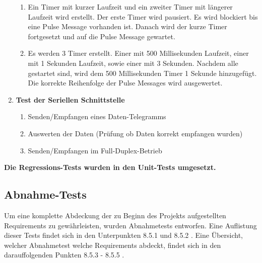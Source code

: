 \documentclass[oneside,a4paper,titlepage]{scrartcl}              %
\begin{document}
\begin{enumerate}
\begin{enumerate}
    \item Ein Timer mit kurzer Laufzeit und ein zweiter Timer mit längerer Laufzeit wird erstellt. Der erste Timer wird pausiert. Es wird blockiert bis eine Pulse Message vorhanden ist. Danach wird der kurze Timer fortgesetzt und auf die Pulse Message gewartet.
    \item Es werden 3 Timer erstellt. Einer mit 500 Millisekunden Laufzeit, einer mit 1 Sekunden Laufzeit, sowie einer mit 3 Sekunden. Nachdem alle gestartet sind, wird dem 500 Millisekunden Timer 1 Sekunde hinzugefügt. Die korrekte Reihenfolge der Pulse Messages wird ausgewertet.
  \end{enumerate}
  \item \textbf{Test der Seriellen Schnittstelle}
  \begin{enumerate}
    \item Senden/Empfangen eines Daten-Telegramms
    \item Auswerten der Daten (Prüfung ob Daten korrekt empfangen wurden)
    \item Senden/Empfangen im Full-Duplex-Betrieb
  \end{enumerate}
\end{enumerate}
\textbf{Die Regressions-Tests wurden in den Unit-Tests umgesetzt.}

\newpage

\subsection{Abnahme-Tests}
Um eine komplette Abdeckung der zu Beginn des Projekts aufgestellten Requirements zu gewährleisten, wurden Abnahmetests entworfen. Eine Auflistung dieser Tests findet sich in den Unterpunkten 8.5.1 und 8.5.2 . \newline
Eine Übersicht, welcher Abnahmetest welche Requirements abdeckt, findet sich in den darauffolgenden Punkten 8.5.3 - 8.5.5 .\newline

\end{document}
